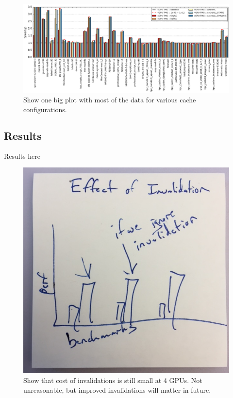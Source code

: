 \begin{figure}[tp]
    \centering
    \includegraphics[width=0.9\columnwidth]{figures/caching.jpg}
    \caption{Show one big plot with most of the data for various cache configurations.}
    \label{fig:caching}
\end{figure}


\subsection{Results}
Results here

\begin{figure}[tp]
    \centering
    \includegraphics[width=0.9\columnwidth]{figures/invalidations.jpg}
    \caption{Show that cost of invalidations is still small at 4 GPUs.  Not unreasonable, but improved invalidations will matter in future.}
    \label{fig:invalidations}
\end{figure}



